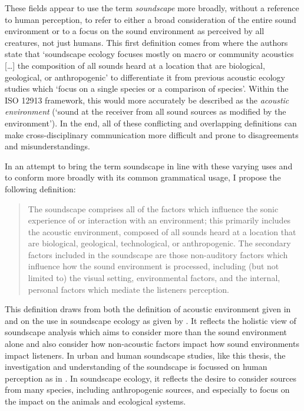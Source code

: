These fields appear to use the term \emph{soundscape} more broadly, without a reference to human perception, to refer to either a broad consideration of the entire sound environment or to a focus on the sound environment as perceived by all creatures, not just humans. This first definition comes from \citet{Pijanowski2011Soundscape} where the authors state that `soundscape ecology focuses mostly on macro or community acoustics [\dots] the composition of all sounds heard at a location that are biological, geological, or anthropogenic' to differentiate it from previous acoustic ecology studies which `focus on a single species or a comparison of species'. Within the ISO 12913 framework, this would more accurately be described as the \emph{acoustic environment} (`sound at the receiver from all sound sources as modified by the environment'). In the end, all of these conflicting and overlapping definitions can make cross-disciplinary communication more difficult and prone to disagreements and misunderstandings. 

In an attempt to bring the term soundscape in line with these varying uses and to conform more broadly with its common grammatical usage, I propose the following definition:

\begin{quote}
The soundscape comprises all of the factors which influence the sonic experience of or interaction with an environment; this primarily includes the acoustic environment, composed of all sounds heard at a location that are biological, geological, technological, or anthropogenic. The secondary factors included in the soundscape are those non-auditory factors which influence how the sound environment is processed, including (but not limited to) the visual setting, environmental factors, and the internal, personal factors 
which mediate the listeners perception.
\end{quote}

This definition draws from both the definition of acoustic environment given in \citet{ISO12913Part1} and on the use in soundscape ecology as given by \citet{Pijanowski2011Soundscape}. It reflects the holistic view of soundscape analysis which aims to consider more than the sound environment alone and also consider how non-acoustic factors impact how sound environments impact listeners. In urban and human soundscape studies, like this thesis, the investigation and understanding of the soundscape is focussed on human perception as in \citet{ISO12913Part1}. In soundscape ecology, it reflects the desire to consider sources from many species, including anthropogenic sources, and especially to focus on the impact on the animals and ecological systems. 

